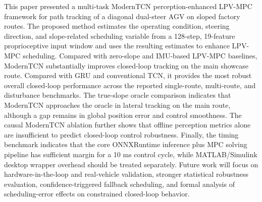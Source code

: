 \documentclass{ieeeaccess}
\begin{document}
This paper presented a multi-task ModernTCN perception-enhanced LPV-MPC framework for path tracking of a diagonal dual-steer AGV on sloped factory routes. The proposed method estimates the operating condition, steering direction, and slope-related scheduling variable from a 128-step, 19-feature proprioceptive input window and uses the resulting estimates to enhance LPV-MPC scheduling. Compared with zero-slope and IMU-based LPV-MPC baselines, ModernTCN substantially improves closed-loop tracking on the main showcase route. Compared with GRU and conventional TCN, it provides the most robust overall closed-loop performance across the reported single-route, multi-route, and disturbance benchmarks. The true-slope oracle comparison indicates that ModernTCN approaches the oracle in lateral tracking on the main route, although a gap remains in global position error and control smoothness. The causal ModernTCN ablation further shows that offline perception metrics alone are insufficient to predict closed-loop control robustness. Finally, the timing benchmark indicates that the core ONNXRuntime inference plus MPC solving pipeline has sufficient margin for a 10 ms control cycle, while MATLAB/Simulink desktop wrapper overhead should be treated separately. Future work will focus on hardware-in-the-loop and real-vehicle validation, stronger statistical robustness evaluation, confidence-triggered fallback scheduling, and formal analysis of scheduling-error effects on constrained closed-loop behavior.


% 
% 

\EOD
\end{document}

